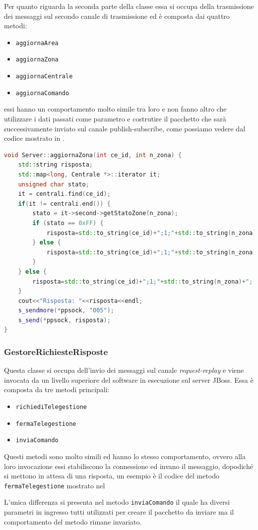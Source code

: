 Per quanto riguarda la seconda parte della classe essa si occupa della trasmissione dei messaggi sul secondo canale di trasmissione ed è composta dai quattro metodi:
\begin{itemize}
	\item \texttt{aggiornaArea}
	\item \texttt{aggiornaZona}
	\item \texttt{aggiornaCentrale}
	\item \texttt{aggiornaComando}
\end{itemize}
essi hanno un comportamento molto simile tra loro e non fanno altro che utilizzare i dati passati come parametro e costrutire il pacchetto che sarà successivamente inviato sul canale publish-subscribe, come possiamo vedere dal codice mostrato in .
\begin{lstlisting}[language=C++,caption=Metodo aggiornaXXX,label=lst:aggiornacode]
void Server::aggiornaZona(int ce_id, int n_zona) {
    std::string risposta;
    std::map<long, Centrale *>::iterator it;
    unsigned char stato;
    it = centrali.find(ce_id);
    if(it != centrali.end()) {
        stato = it->second->getStatoZone(n_zona);
        if (stato == 0xFF) {
            risposta=std::to_string(ce_id)+";1;"+std::to_string(n_zona)+";-1;-1;-1";
        } else {
            risposta=std::to_string(ce_id)+";1;"+std::to_string(n_zona)+";"+std::to_string(stato&0x01)+";"+std::to_string(stato&0x02)+";"+std::to_string(stato&0x04);
        }
    } else {
        risposta=std::to_string(ce_id)+";1;"+std::to_string(n_zona)+";-1;-1;-1";
    }
    cout<<"Risposta: "<<risposta<<endl;
    s_sendmore(*ppsock, "005");
    s_send(*ppsock, risposta);
}
\end{lstlisting}
\subsubsection{GestoreRichiesteRisposte}
Questa classe si occupa dell'invio dei messaggi sul canale \emph{request-replay} e viene invocata da un livello superiore del software in esecuzione sul server JBoss. Essa è composta da tre metodi principali:
\begin{itemize}
	\item \texttt{richiediTelegestione}
	\item \texttt{fermaTelegestione}
	\item \texttt{inviaComando}
\end{itemize}
Questi metodi sono molto simili ed hanno lo stesso comportamento, ovvero alla loro invocazione essi stabiliscono la connessione ed invano il messaggio, dopodiché si mettono in attesa di una risposta, un esempio è il codice del metodo \texttt{fermaTelegestione} mostrato nel 

L'unica differenza si presenta nel metodo \texttt{inviaComando} il quale ha diversi parametri in ingresso tutti utilizzati per creare il pacchetto da inviare ma il comportamento del metodo rimane invariato.
